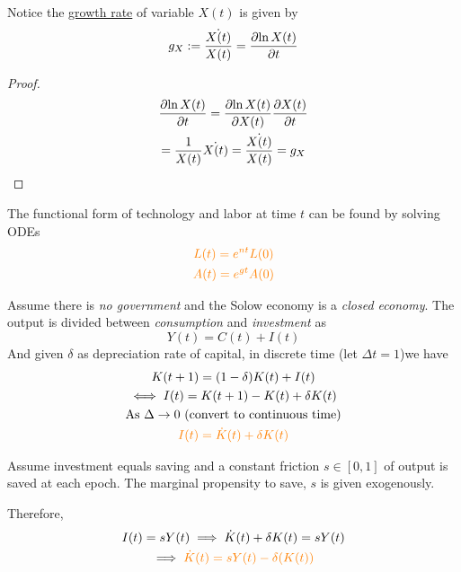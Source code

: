 \documentclass[]{article}
\begin{document}
			\begin{proposition}
				Notice the \ul{growth rate} of variable $X(t)$ is given by 
				\[
					g_X := \frac{\dot{X(t)}}{X(t)} = \frac{\partial{\ln{X(t)}}}{\partial{t}}
				\]
			\end{proposition}
			\begin{proof}
				\begin{gather*}
					\frac{\partial{\ln{X(t)}}}{\partial{t}} = \frac{\partial{\ln{X(t)}}}{\partial{X(t)}} \frac{\partial{X(t)}}{\partial{t}} \\
					= \frac{1}{X(t)} \dot{X(t)}
					= \frac{\dot{X(t)}}{X(t)}
					= g_X \\
				\end{gather*}
			\end{proof}
			
			\begin{proposition}
				The functional form of technology and labor at time $t$ can be found by solving ODEs 
				\begin{gather}
					\textcolor{orange}{
						L(t) = e^{nt} L(0)
						} \\
					\textcolor{orange}{
						A(t) = e^{gt} A(0)
						}
				\end{gather}
			\end{proposition}
			
			\par Assume there is \emph{no government} and the Solow economy is a \emph{closed economy}. The output is divided between \emph{consumption} and \emph{investment} as 
			\[
				Y(t) = C(t) + I(t)
			\]
			And given $\delta$ as depreciation rate of capital, in discrete time (let $\Delta t = 1$)we have 
			\begin{gather*}
				K(t+1) = (1-\delta)K(t) + I(t) \\
				\iff I(t) = K(t+1) - K(t) + \delta K(t) \\
				\text{{As }} \Delta \to 0 \text{{ (convert to continuous time)}}\\
				\textcolor{orange}{I(t) = \dot{K}(t) + \delta K(t)}
			\end{gather*}
			
			\begin{assumption}
				Assume investment equals saving and a constant friction $s \in [0, 1]$ of output is saved at each epoch. The marginal propensity to save, $s$ is given exogenously.
			\end{assumption}
			
			\par Therefore,
			\begin{gather*}
				I(t) = sY(t) \implies \dot{K}(t) + \delta K(t) = sY(t) \\
				\implies \textcolor{orange}{
					\dot{K}(t) = sY(t) - \delta(K(t))
					}
			\end{gather*}
			
\end{document}
